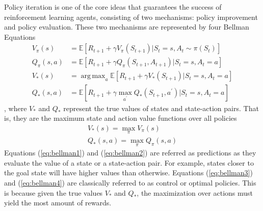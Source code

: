 \documentclass[12pt]{report}
\DeclareMathOperator*{\argmax}{arg\,max}
\begin{document}
Policy iteration is one of the core ideas that guarantees the success of reinforcement learning agents, consisting of two mechanisms: policy improvement and policy evaluation. These two mechanisms are represented by four Bellman Equations \cite{sutton2018reinforcement} \cite{sutton1999between}
\begin{align}
    V_\pi(s)&=\mathbb{E}[R_{t+1}+\gamma V_\pi(S_{t+1})|S_t=s, A_t\sim \pi(S_t)] \label{eq:bellman1}\\
    Q_\pi(s,a)&=\mathbb{E}[R_{t+1}+\gamma Q_\pi(S_{t+1},A_{t+1})|S_t=s, A_t=a]\label{eq:bellman2}\\
    V_*(s)&=\argmax_a \mathbb{E}[R_{t+1}+\gamma V_*(S_{t+1})|S_t=s, A_t=a]\label{eq:bellman3}\\
    Q_*(s,a)&=\mathbb{E}[R_{t+1}+\gamma \max_{a^\prime} Q_*(S_{t+1},a^\prime)|S_t=s, A_t=a]\label{eq:bellman4}
\end{align}
, where $V_*$ and $Q_*$ represent the true values of states and state-action pairs. That is, they are the maximum state and action value functions over all policies
\begin{align}
    V_*(s) = \max_\pi V_\pi(s)\\
    Q_*(s,a) = \max_\pi Q_\pi(s,a)
\end{align}
Equations (\ref{eq:bellman1}) and (\ref{eq:bellman2}) are referred as predictions as they evaluate the value of a state or a state-action pair. For example, states closer to the goal state will have higher values than otherwise. Equations (\ref{eq:bellman3}) and (\ref{eq:bellman4}) are classically referred to as control or optimal policies. This is because given the true values $V_*$ and $Q_*$, the maximization over actions must yield the most amount of rewards.\\

\end{document}
